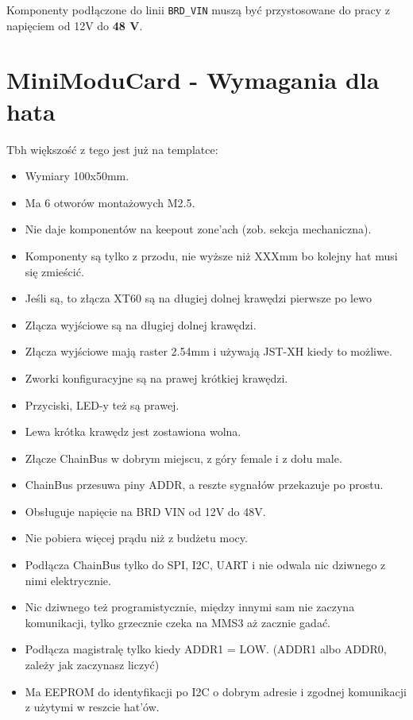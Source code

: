\documentclass[b5paper, 10pt, twoside]{book}
\begin{document}
Komponenty podłączone do linii \texttt{BRD\_VIN} muszą być przystosowane do pracy z napięciem od 12V do \textbf{48 V}.


\section{MiniModuCard - Wymagania dla hata}
Tbh większość z tego jest już na templatce:

\begin{itemize}
  \item Wymiary 100x50mm.
  \item Ma 6 otworów montażowych M2.5.
  \item Nie daje komponentów na keepout zone'ach (zob. sekcja mechaniczna).
  \item Komponenty są tylko z przodu, nie wyższe niż XXXmm bo kolejny hat musi się zmieścić. %
  \item Jeśli są, to złącza XT60 są na długiej dolnej krawędzi pierwsze po lewo
  \item Złącza wyjściowe są na długiej dolnej krawędzi.
  \item Złącza wyjściowe mają raster 2.54mm i używają JST-XH kiedy to możliwe.
  \item Zworki konfiguracyjne są na prawej krótkiej krawędzi.
  \item Przyciski, LED-y też są prawej.
  \item Lewa krótka krawędz jest zostawiona wolna.
  \item Złącze ChainBus w dobrym miejscu, z góry female i z dołu male.
  \item ChainBus przesuwa piny ADDR, a reszte sygnałów przekazuje po prostu.
  \item Obsługuje napięcie na BRD VIN od 12V do 48V.
  \item Nie pobiera więcej prądu niż z budżetu mocy.
  \item Podłącza ChainBus tylko do SPI, I2C, UART i nie odwala nic dziwnego z nimi elektrycznie.
  \item Nic dziwnego też programistycznie, między innymi sam nie zaczyna komunikacji, tylko grzecznie czeka na MMS3 aż zacznie gadać.
  \item Podłącza magistralę tylko kiedy ADDR1 = LOW. (ADDR1 albo ADDR0, zależy jak zaczynasz liczyć)
  \item Ma EEPROM do identyfikacji po I2C o dobrym adresie i zgodnej komunikacji z użytymi w reszcie hat'ów. 

\end{itemize}
\end{document}
